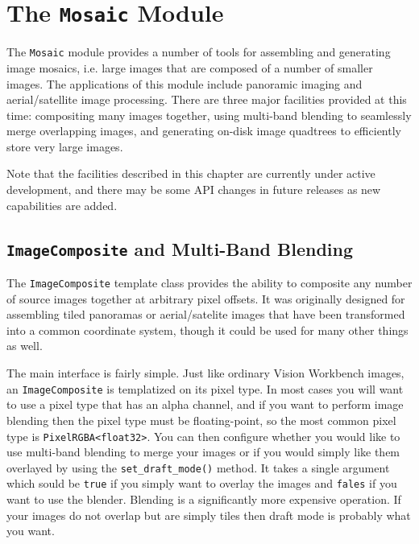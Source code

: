 \chapter{The {\tt Mosaic} Module}\label{ch:mosaic-module}

The \verb#Mosaic# module provides a number of tools for assembling and
generating image mosaics, i.e. large images that are composed of a
number of smaller images.  The applications of this module include
panoramic imaging and aerial/satellite image processing.  There are 
three major facilities provided at this time: compositing many images 
together, using multi-band blending to seamlessly merge overlapping 
images, and generating on-disk image quadtrees to efficiently store 
very large images.

Note that the facilities described in this chapter are currently under
active development, and there may be some API changes in future
releases as new capabilities are added.

\section{{\tt ImageComposite} and Multi-Band Blending}\label{sec:imagecomposite}

The \verb#ImageComposite# template class provides the ability to
composite any number of source images together at arbitrary pixel
offsets.  It was originally designed for assembling tiled panoramas or
aerial/satelite images that have been transformed into a common
coordinate system, though it could be used for many other things as
well.

The main interface is fairly simple.  Just like ordinary Vision
Workbench images, an \verb#ImageComposite# is templatized on its pixel
type.  In most cases you will want to use a pixel type that has an
alpha channel, and if you want to perform image blending then the
pixel type must be floating-point, so the most common pixel type is
\verb#PixelRGBA<float32>#.  You can then configure whether you would 
like to use multi-band blending to merge your images or if you would 
simply like them overlayed by using the \verb#set_draft_mode()# 
method.  It takes a single argument which sould be \verb#true# if 
you simply want to overlay the images and \verb#fales# if you want 
to use the blender.  Blending is a significantly more expensive 
operation.  If your images do not overlap but are simply tiles then 
draft mode is probably what you want. 

